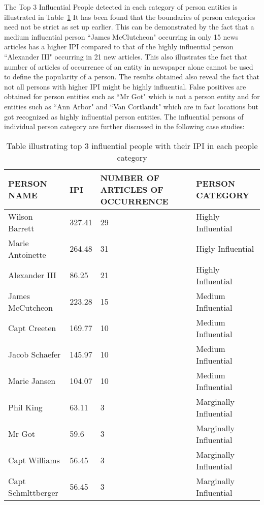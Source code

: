The Top 3  Influential People detected in each category of person entities is illustrated in Table~\ref{table:pcat1}
It has been found that the boundaries of person categories need not be strict as set up earlier. This can be demonstrated by the fact that a medium influential person ``James McClutcheon" occurring in only 15 news articles has a higher IPI compared to that of the highly influential person ``Alexander III" occurring in 21 new articles. This also illustrates the fact that number of articles of occurrence of an entity in newspaper alone cannot be used to define the popularity of a person. The results obtained also reveal the fact that not all persons with higher IPI might be highly influential. False positives are obtained for person entities  such as ``Mr Got" which is not a person entity and for entities such as ``Ann Arbor" and ``Van Cortlandt" which are in fact locations but got recognized as highly influential person entities.
The influential persons of individual person category are further discussed in the following case studies: 
\begin{table}
\begin{center}
    \begin{tabular}{|l|l|p{3.5cm}|p{4cm}|}
    \hline
    \textbf{PERSON NAME}     & \textbf{IPI}  &  \textbf{NUMBER OF ARTICLES OF OCCURRENCE} &  \textbf{PERSON CATEGORY}\\  \hline
      
    Wilson Barrett &  327.41 &	29 &  Highly Influential\\ \hline
    Marie Antoinette &     264.48 &	31 &	Higly Influential\\ \hline  
    Alexander III & 86.25  &	21 &	Highly Influential\\  \hline
	James McCutcheon & 223.28 &	15	&	Medium Influential\\  \hline
	Capt Creeten & 169.77 &	10	&	 Medium Influential \\ \hline 
	Jacob Schaefer & 145.97 & 	10	&	Medium Influential \\ \hline 
 	Marie Jansen & 104.07 & 	10	&	Medium Influential \\ \hline 
	Phil King&63.11	&	3	&	Marginally Influential \\ \hline
 	Mr Got	&	59.6	& 3	&	Marginally Influential \\ \hline
	 Capt Williams & 56.45		&	3	&	Marginally Influential \\ \hline
 	Capt Schmlttberger	&	56.45	&	3	&	Marginally Influential \\ \hline
  \end{tabular}
  \end{center}
    \caption {Table illustrating top 3 influential people with their IPI in each people category}
\label{table:pcat1}
\end{table}



